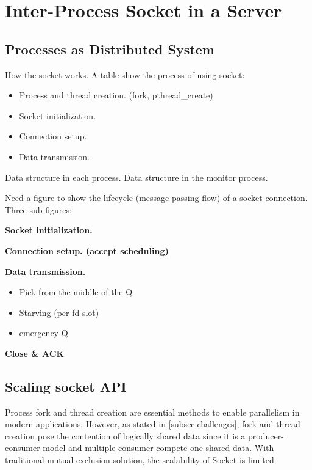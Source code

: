\section{Inter-Process Socket in a Server}
\label{sec:intra-server}

\subsection{Processes as Distributed System}
\label{subsec:socket-api}

How the socket works. A table show the process of using socket:

\begin{itemize}
	\item Process and thread creation. (fork, pthread\_create)
	\item Socket initialization.
	\item Connection setup.
	\item Data transmission.
\end{itemize}


Data structure in each process. Data structure in the monitor process.

Need a figure to show the lifecycle (message passing flow) of a socket connection. Three sub-figures:


	 \textbf{Socket initialization.}
	  
	 \textbf{Connection setup. (accept scheduling)}
	 
	 \textbf{Data transmission.}
\begin{itemize}
	\item Pick from the middle of the Q
	\item Starving (per fd slot)
	\item emergency Q
\end{itemize}

    \textbf{Close \& ACK}


\subsection{Scaling socket API}
\label{subsec:fork}

Process fork and thread creation are essential methods to enable parallelism in modern applications. 
However, as stated in \ref{subsec:challenges}, fork and thread creation pose the contention of logically shared data since it is a producer-consumer model and multiple consumer compete one shared data. With traditional mutual exclusion solution, the scalability of Socket is limited.

